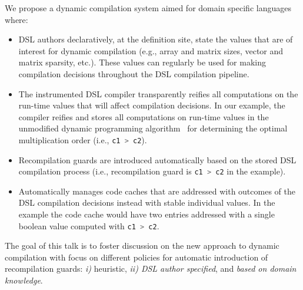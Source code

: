 \documentclass{llncs}
\newcommand{\scode}[1]{\lstinline[language=Scala,columns=fixed,basicstyle=\ttfamily,keywordstyle=\ttfamily]|#1|}
\newcommand{\code}[1]{\scode{#1}}
\begin{document}
We propose a dynamic compilation system aimed for domain specific languages where:
\begin{itemize}

  \item DSL authors declaratively, at the definition site, state the values that
    are of interest for dynamic compilation (e.g., array and matrix sizes, vector
    and matrix sparsity, etc.). These values can regularly be used for making
    compilation decisions throughout the DSL compilation pipeline.

  \item The instrumented DSL compiler transparently reifies all computations on the run-time values that will affect compilation decisions.
   In our example, the compiler reifies and stores all computations on run-time values in the
   unmodified dynamic programming algorithm~\cite{cormen2001introduction} for determining the
   optimal multiplication order (i.e., \code{c1 > c2}).

  \item Recompilation guards are introduced automatically based on the stored DSL
   compilation process (i.e., recompilation guard is \code{c1 > c2} in the example).

  \item Automatically manages code caches that are addressed with outcomes of the
   DSL compilation decisions instead with stable individual values. In the example
   the code cache would have two entries addressed with a single boolean
   value computed with \code{c1 > c2}.

\end{itemize}

The goal of this talk is to foster discussion on the new approach to dynamic compilation with focus on different policies for automatic introduction of recompilation guards:
 \emph{i)} heuristic, \emph{ii) DSL author specified}, and \emph{based on domain knowledge}.



\end{document}
